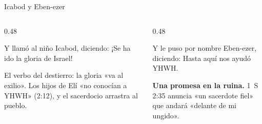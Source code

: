 \begin{frame}{Icabod y Eben-ezer}
\begin{columns}[T,onlytextwidth]
\begin{column}{0.48\textwidth}
\par\smallskip
\begin{cita}Y llamó al niño Icabod, diciendo: ¡Se ha ido la gloria de Israel!\end{cita}
\begin{notalam}
El verbo del destierro: la gloria «va al exilio». Los hijos de Elí «no conocían a YHWH» (2:12), y el sacerdocio arrastra al pueblo.
\end{notalam}
\end{column}
\begin{column}{0.48\textwidth}
\par\smallskip
\begin{cita}Y le puso por nombre Eben-ezer, diciendo: Hasta aquí nos ayudó YHWH.\end{cita}
\begin{clave}
\textbf{Una promesa en la ruina.} 1~S 2:35 anuncia «un sacerdote fiel» que andará «delante de mi ungido».
\end{clave}
\end{column}
\end{columns}
\end{frame}

